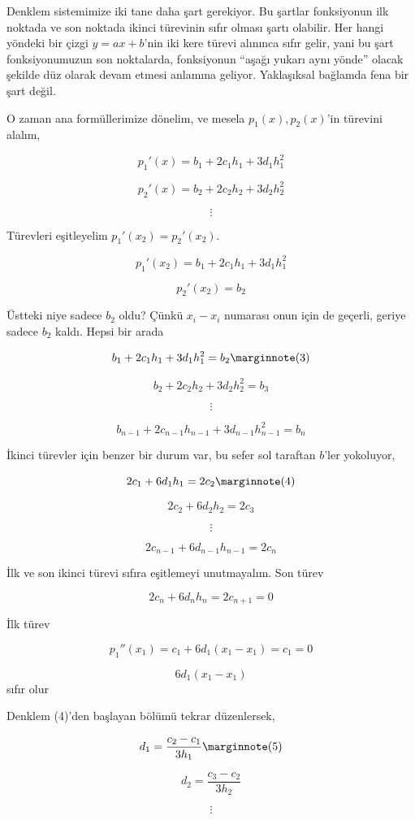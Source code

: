 \documentclass[12pt,fleqn]{article}\usepackage{../../common}
\begin{document}
Denklem sistemimize iki tane daha şart gerekiyor. Bu şartlar fonksiyonun
ilk noktada ve son noktada ikinci türevinin sıfır olması şartı
olabilir. Her hangi yöndeki bir çizgi $y = ax + b$'nin iki kere türevi
alınınca sıfır gelir, yani bu şart fonksiyonumuzun son noktalarda,
fonksiyonun ``aşağı yukarı aynı yönde'' olacak şekilde düz olarak devam
etmesi anlamına geliyor. Yaklaşıksal bağlamda fena bir şart değil. 

O zaman ana formüllerimize dönelim, ve mesela $p_1(x),p_2(x)$'in türevini
alalım,

$$ p_1'(x) = b_1 + 2c_1h_1 + 3d_1h_1^2 $$

$$ p_2'(x) = b_2 + 2c_2h_2 + 3d_2h_2^2 $$

$$ \vdots $$

Türevleri eşitleyelim $p_1'(x_2) = p_2'(x_2)$. 

$$ p_1'(x_2) = b_1 + 2c_1h_1 + 3d_1h_1^2 $$

$$  p_2'(x_2) = b_2 $$

Üstteki niye sadece $b_2$ oldu? Çünkü $x_i-x_i$ numarası onun için de
geçerli, geriye sadece $b_2$ kaldı. Hepsi bir arada

$$  b_1 + 2c_1h_1 + 3d_1h_1^2  = b_2 
\mlabel{3}$$

$$  b_2 + 2c_2h_2 + 3d_2h_2^2 = b_3 $$

$$ \vdots $$

$$  b_{n-1} + 2c_{n-1}h_{n-1} + 3d_{n-1}h_{n-1}^2 =  b_n $$

İkinci türevler için benzer bir durum var, bu sefer sol taraftan $b$'ler
yokoluyor, 

$$ 2c_1 + 6d_1h_1 = 2c_2 
\mlabel{4} $$

$$ 2c_2 + 6d_2h_2 = 2c_3 $$

$$ \vdots $$

$$ 2c_{n-1} + 6d_{n-1}h_{n-1} = 2c_n $$

İlk ve son ikinci türevi sıfıra eşitlemeyi unutmayalım. Son türev

$$ 2c_n + 6d_nh_n = 2c_{n+1} = 0 $$

İlk türev

$$ p_1''(x_1) =  c_1 + 6d_1(x_1-x_1)  = c_1 = 0$$

$$ 6d_1(x_1-x_1) $$ sıfır olur

Denklem (4)'den başlayan bölümü tekrar düzenlersek, 

$$ d_1 = \frac{ c_2 - c_1}{3h_1} 
\mlabel{5} $$

$$ d_2 = \frac{ c_3 - c_2}{3h_2} $$

$$ \vdots $$
\end{document}
